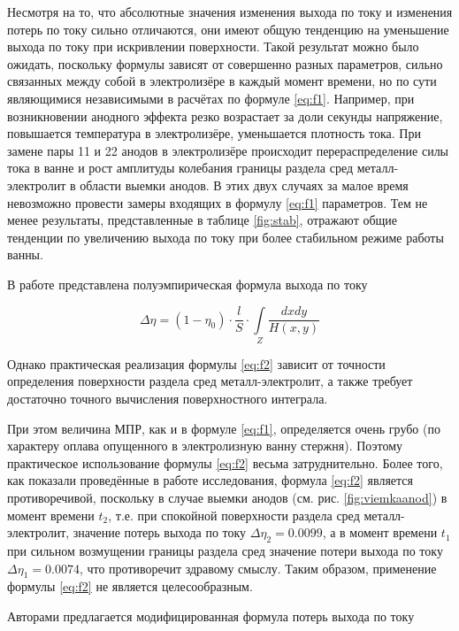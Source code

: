 \documentclass{article}
\begin{document}
Несмотря на то, что абсолютные значения изменения выхода по току и изменения потерь по току сильно отличаются, они имеют общую тенденцию на уменьшение выхода по току при искривлении поверхности. Такой результат можно было ожидать, поскольку формулы зависят от совершенно разных параметров, сильно связанных между собой в электролизёре в каждый момент времени, но по сути являющимися независимыми в расчётах по формуле \ref{eq:f1}. Например, при возникновении анодного эффекта резко возрастает за доли секунды напряжение, повышается температура в электролизёре, уменьшается плотность тока. При замене пары 11 и 22 анодов в электролизёре происходит перераспределение силы тока в ванне и рост амплитуды колебания границы раздела сред металл-электролит в области выемки анодов. В этих двух случаях за малое время невозможно провести замеры входящих в формулу \ref{eq:f1} параметров. Тем не менее результаты, представленные в таблице \ref{fig:stab}, отражают общие тенденции по увеличению выхода по току при более стабильном режиме работы ванны.

В работе \cite{litlink:derkach2} представлена полуэмпирическая формула выхода по току

\begin{equation} \label{eq:f2}
\Delta \eta = (1- \eta_0) \cdot \frac{l}{S} \cdot \int\limits_Z \frac{dxdy}{H(x,y)}
\end{equation}

Однако практическая реализация формулы \ref{eq:f2} зависит от точности определения поверхности раздела сред металл-электролит, а также требует достаточно точного вычисления поверхностного интеграла. 

При этом величина МПР, как и в формуле \ref{eq:f1}, определяется очень грубо (по характеру оплава опущенного в электролизную ванну стержня). Поэтому практическое использование формулы \ref{eq:f2} весьма затруднительно. Более того, как показали проведённые в работе исследования, формула \ref{eq:f2} является противоречивой, поскольку в случае выемки анодов (см. рис. \ref{fig:viemkaanod}) в момент времени $t_2$, т.е. при спокойной поверхности раздела сред металл-электролит, значение  потерь выхода по току $\Delta\eta_2 = 0.0099$, а в момент времени $t_1$ при сильном возмущении границы раздела сред значение потери выхода по току $\Delta\eta_1 = 0.0074$, что противоречит здравому смыслу.  Таким образом, применение формулы \ref{eq:f2} не является целесообразным.

Авторами предлагается модифицированная формула потерь выхода по току 
\end{document}
